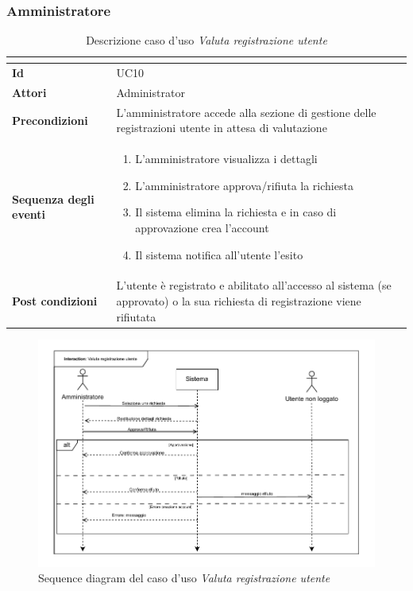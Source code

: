 \documentclass[a4paper]{article}
\begin{document}
    \subsubsection{Amministratore}
\begin{table}[H]
    \centering
    \renewcommand{\arraystretch}{1.5}
    \begin{tabular}{|>{\bfseries}l|p{10cm}|}
        \hline
        \multicolumn{2}{|c|}{\textbf{Caso d'uso: Valuta registrazione utente}} \\
        \hline
        \textbf{Id} & UC10 \\ \hline
        \textbf{Attori} & Administrator \\ \hline
        \textbf{Precondizioni} & L'amministratore accede alla sezione di gestione delle registrazioni utente in attesa di valutazione \\ \hline
        \textbf{Sequenza degli eventi} &
        \begin{enumerate}
            \item L'amministratore visualizza i dettagli
            \item L'amministratore approva/rifiuta la richiesta
            \item Il sistema elimina la richiesta e in caso di approvazione crea l'account
            \item Il sistema notifica all'utente l'esito
        \end{enumerate}\\ \hline
        \textbf{Post condizioni} & L'utente è registrato e abilitato all'accesso al sistema (se approvato) o la sua richiesta di registrazione viene rifiutata \\ \hline
    \end{tabular}
    \caption{Descrizione caso d'uso \textit{Valuta registrazione utente}}
    \label{tab:evaluate_user_registration-usecase}
\end{table}

\begin{figure}[H]
    \centering
    \includegraphics{./figures/valuta_richieste}
    \caption{Sequence diagram del caso d'uso \textit{Valuta registrazione utente}}
    \label{fig:sd_valuta_richiesta}
\end{figure}
\end{document}
